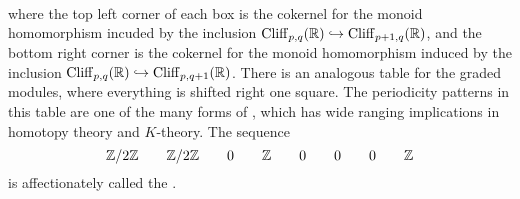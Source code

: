  \\\\\\
where the top left corner of each box is the cokernel for the monoid homomorphism
incuded by the inclusion $\operatorname{Cliff}_{p,q}(\mathbb{R}) \hookrightarrow \operatorname{Cliff}_{p+1,q}(\mathbb{R})$,
and the bottom right  corner is the cokernel for the monoid homomorphism induced
by the inclusion $\operatorname{Cliff}_{p,q}(\mathbb{R}) \hookrightarrow \operatorname{Cliff}_{p,q+1}(\mathbb{R})$. There
is an analogous table for the graded modules, where everything is shifted right
one square. The periodicity patterns in this table are one of the many
forms of , which has wide ranging implications in homotopy
theory and $K$-theory. The sequence
\[
\mathbb{Z}/2\mathbb{Z} \qquad \mathbb{Z}/2\mathbb{Z} \qquad 0 \qquad \mathbb{Z} \qquad 0 \qquad 0 \qquad 0 \qquad \mathbb{Z}
\]
is affectionately called the .
%